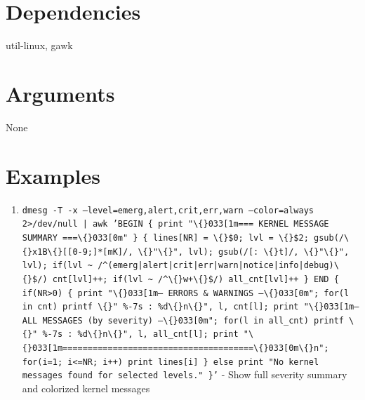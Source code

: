 \documentclass[openany]{book}
\begin{document}
\section*{Dependencies}
util-linux, gawk


\section*{Arguments}
None

\section*{Examples}
\begin{enumerate}
  \item \texttt{dmesg -T -x --level=emerg,alert,crit,err,warn --color=always 2>/dev/null | awk 'BEGIN \{ print "\textbackslash\{\}033[1m=== KERNEL MESSAGE SUMMARY ===\textbackslash\{\}033[0m" \} \{ lines[NR] = \textbackslash\{\}\$0; lvl = \textbackslash\{\}\$2; gsub(/\textbackslash\{\}x1B\textbackslash\{\}[[0-9;]*[mK]/, \textbackslash\{\}"\textbackslash\{\}", lvl); gsub(/[: \textbackslash\{\}t]/, \textbackslash\{\}"\textbackslash\{\}", lvl); if(lvl \textasciitilde{} /\textasciicircum{}(emerg|alert|crit|err|warn|notice|info|debug)\textbackslash\{\}\$/) cnt[lvl]++; if(lvl \textasciitilde{} /\textasciicircum{}\textbackslash\{\}w+\textbackslash\{\}\$/) all\_cnt[lvl]++ \} END \{ if(NR>0) \{ print "\textbackslash\{\}033[1m--- ERRORS \& WARNINGS ---\textbackslash\{\}033[0m"; for(l in cnt) printf \textbackslash\{\}"  \%-7s : \%d\textbackslash\{\}n\textbackslash\{\}", l, cnt[l]; print "\textbackslash\{\}033[1m--- ALL MESSAGES (by severity) ---\textbackslash\{\}033[0m"; for(l in all\_cnt) printf \textbackslash\{\}"  \%-7s : \%d\textbackslash\{\}n\textbackslash\{\}", l, all\_cnt[l]; print "\textbackslash\{\}033[1m======================================\textbackslash\{\}033[0m\textbackslash\{\}n"; for(i=1; i<=NR; i++) print lines[i] \} else print "No kernel messages found for selected levels." \}'} - Show full severity summary and colorized kernel messages

\end{enumerate}
\end{document}
